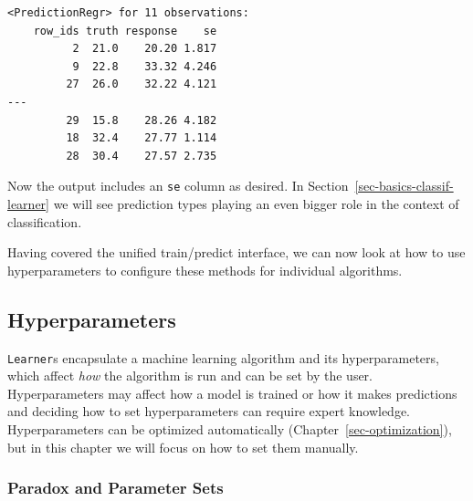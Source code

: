 \begin{Shaded}
\begin{Highlighting}[]
\OtherTok{=} \NormalTok{(}\NormalTok{, } \NormalTok{)}
\SpecialCharTok{$}\SpecialCharTok{$}
\SpecialCharTok{$}\SpecialCharTok{$}
\end{Highlighting}
\end{Shaded}

\begin{verbatim}
<PredictionRegr> for 11 observations:
    row_ids truth response    se
          2  21.0    20.20 1.817
          9  22.8    33.32 4.246
         27  26.0    32.22 4.121
---                             
         29  15.8    28.26 4.182
         18  32.4    27.77 1.114
         28  30.4    27.57 2.735
\end{verbatim}

Now the output includes an \texttt{se} column as desired. In
Section~\ref{sec-basics-classif-learner} we will see prediction types
playing an even bigger role in the context of classification.

Having covered the unified train/predict interface, we can now look at
how to use hyperparameters to configure these methods for individual
algorithms.

\hypertarget{sec-param-set}{%
\subsection{Hyperparameters}\label{sec-param-set}}

\texttt{Learner}s encapsulate a machine learning algorithm and its
hyperparameters, which affect \emph{how} the
algorithm is run and can be set by the user. Hyperparameters may affect
how a model is trained or how it makes predictions and deciding how to
set hyperparameters can require expert knowledge. Hyperparameters can be
optimized automatically (Chapter~\ref{sec-optimization}), but in this
chapter we will focus on how to set them manually.

\hypertarget{paradox-and-parameter-sets}{%
\subsubsection{Paradox and Parameter
Sets}\label{paradox-and-parameter-sets}}

